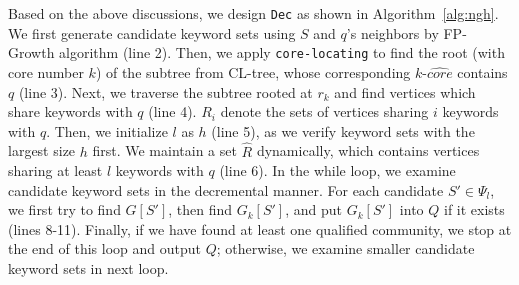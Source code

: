 
Based on the above discussions, we design {\tt Dec} as shown in Algorithm~\ref{alg:ngh}.
We first generate candidate keyword sets using $S$ and $q$'s neighbors by FP-Growth algorithm (line 2).
Then, we apply {\tt core-locating} to find the root (with core number $k$) of the subtree from CL-tree,
whose corresponding $k$-$\widehat {core}$ contains $q$ (line 3).
Next, we traverse the subtree rooted at $r_k$
and find vertices which share keywords with $q$ (line 4).
$R_i$ denote the sets of vertices sharing $i$ keywords with $q$.
Then, we initialize $l$ as $h$ (line 5),
as we verify keyword sets with the largest size $h$ first.
We maintain a set $\widehat R$ dynamically,
which contains vertices sharing at least $l$ keywords with $q$ (line 6).
In the while loop, we examine candidate keyword sets in the decremental manner.
For each candidate $S'\in\Psi_l$, we first try to find $G[S']$, then find $G_k[S']$,
and put $G_k[S']$ into $Q$ if it exists (lines 8-11).
Finally, if we have found at least one qualified community,
we stop at the end of this loop and output $Q$;
otherwise, we examine smaller candidate keyword sets in next loop. 
